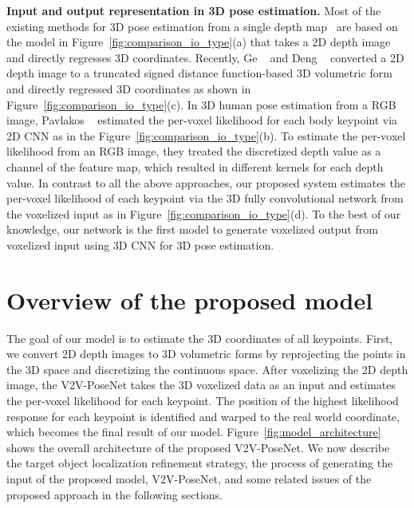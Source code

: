 \documentclass[10pt,twocolumn,letterpaper]{article}
\begin{document}
{\bf Input and output representation in 3D pose estimation.}
Most of the existing methods for 3D pose estimation from a single depth map~\cite{oberweger2015hands,oberweger2015training,bouchacourt2016disco,Wan_2017_CVPR,guo2017ren,guo2017towards,Oberweger_2017_ICCV_Workshops,chen2017pose,madadi2017end,fourure2017multi,haque2016towards} are based on the model in Figure~\ref{fig:comparison_io_type}(a) that takes a 2D depth image and directly regresses 3D coordinates. Recently, Ge \etal~\cite{ge20173d} and Deng \etal~\cite{deng2017hand3d} converted a 2D depth image to a truncated signed distance function-based 3D volumetric form and directly regressed 3D coordinates as shown in Figure~\ref{fig:comparison_io_type}(c). In 3D human pose estimation from a RGB image, Pavlakos \etal~\cite{pavlakos2016coarse} estimated the per-voxel likelihood for each body keypoint via 2D CNN as in the Figure~\ref{fig:comparison_io_type}(b). To estimate the per-voxel likelihood from an RGB image, they treated the discretized depth value as a channel of the feature map, which resulted in different kernels for each depth value. In contrast to all the above approaches, our proposed system estimates the per-voxel likelihood of each keypoint via the 3D fully convolutional network from the voxelized input as in Figure~\ref{fig:comparison_io_type}(d). To the best of our knowledge, our network is the first model to generate voxelized output from voxelized input using 3D CNN for 3D pose estimation.








 \section{Overview of the proposed model}

The goal of our model is to estimate the 3D coordinates of all keypoints. First, we convert 2D depth images to 3D volumetric forms by reprojecting the points in the 3D space and discretizing the continuous space. After voxelizing the 2D depth image, the V2V-PoseNet takes the 3D voxelized data as an input and estimates the per-voxel likelihood for each keypoint. The position of the highest likelihood response for each keypoint is identified and warped to the real world coordinate, which becomes the final result of our model. Figure~\ref{fig:model_architecture} shows the overall architecture of the proposed V2V-PoseNet. We now describe the target object localization refinement strategy, the process of generating the input of the proposed model, V2V-PoseNet, and some related issues of the proposed approach in the following sections.
\end{document}
